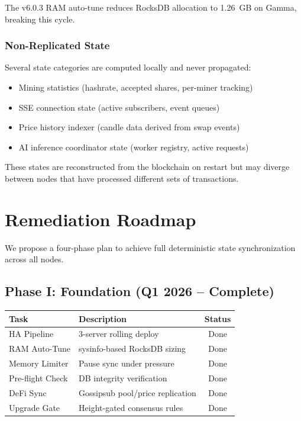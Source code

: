 \documentclass[11pt,a4paper,twocolumn]{article}
\begin{document}
The v6.0.3 RAM auto-tune reduces RocksDB allocation to 1.26~GB on Gamma,
breaking this cycle.

\subsubsection{Non-Replicated State}

Several state categories are computed locally and never propagated:

\begin{itemize}[nosep,leftmargin=*]
    \item Mining statistics (hashrate, accepted shares, per-miner tracking)
    \item SSE connection state (active subscribers, event queues)
    \item Price history indexer (candle data derived from swap events)
    \item AI inference coordinator state (worker registry, active requests)
\end{itemize}

These states are reconstructed from the blockchain on restart but may diverge
between nodes that have processed different sets of transactions.

\section{Remediation Roadmap}
\label{sec:roadmap}

We propose a four-phase plan to achieve full deterministic state synchronization
across all nodes.

\subsection{Phase I: Foundation (Q1 2026 -- Complete)}

\begin{table}[H]
\centering
\scriptsize
\begin{tabularx}{\columnwidth}{lXc}
\toprule
\textbf{Task} & \textbf{Description} & \textbf{Status} \\
\midrule
HA Pipeline & 3-server rolling deploy & \textcolor{qnkgreen}{Done} \\
RAM Auto-Tune & sysinfo-based RocksDB sizing & \textcolor{qnkgreen}{Done} \\
Memory Limiter & Pause sync under pressure & \textcolor{qnkgreen}{Done} \\
Pre-flight Check & DB integrity verification & \textcolor{qnkgreen}{Done} \\
DeFi Sync & Gossipsub pool/price replication & \textcolor{qnkgreen}{Done} \\
Upgrade Gate & Height-gated consensus rules & \textcolor{qnkgreen}{Done} \\
\bottomrule
\end{tabularx}
\end{table}
\end{document}
